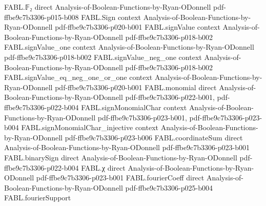 \begin{theorem}
\label{FABL.isDualFourierGranular_signValue_of_dualSpectralSparsity_le}
\leanok
{}
\proofstep
  {FABL.𝔽₂}
  {direct}
  {Analysis-of-Boolean-Functions-by-Ryan-ODonnell}
  {pdf-ffbe9c7b3306-p015-b008}
\proofstep
  {FABL.Sign}
  {context}
  {Analysis-of-Boolean-Functions-by-Ryan-ODonnell}
  {pdf-ffbe9c7b3306-p020-b001}
\proofstep
  {FABL.signValue}
  {context}
  {Analysis-of-Boolean-Functions-by-Ryan-ODonnell}
  {pdf-ffbe9c7b3306-p018-b002}
\proofstep
  {FABL.signValue_one}
  {context}
  {Analysis-of-Boolean-Functions-by-Ryan-ODonnell}
  {pdf-ffbe9c7b3306-p018-b002}
\proofstep
  {FABL.signValue_neg_one}
  {context}
  {Analysis-of-Boolean-Functions-by-Ryan-ODonnell}
  {pdf-ffbe9c7b3306-p018-b002}
\proofstep
  {FABL.signValue_eq_neg_one_or_one}
  {context}
  {Analysis-of-Boolean-Functions-by-Ryan-ODonnell}
  {pdf-ffbe9c7b3306-p020-b001}
\proofstep
  {FABL.monomial}
  {direct}
  {Analysis-of-Boolean-Functions-by-Ryan-ODonnell}
  {pdf-ffbe9c7b3306-p022-b001,
    pdf-ffbe9c7b3306-p022-b004}
\proofstep
  {FABL.signMonomialChar}
  {context}
  {Analysis-of-Boolean-Functions-by-Ryan-ODonnell}
  {pdf-ffbe9c7b3306-p023-b001,
    pdf-ffbe9c7b3306-p023-b004}
\proofstep
  {FABL.signMonomialChar_injective}
  {context}
  {Analysis-of-Boolean-Functions-by-Ryan-ODonnell}
  {pdf-ffbe9c7b3306-p023-b006}
\proofstep
  {FABL.coordinateSum}
  {direct}
  {Analysis-of-Boolean-Functions-by-Ryan-ODonnell}
  {pdf-ffbe9c7b3306-p023-b001}
\proofstep
  {FABL.binarySign}
  {direct}
  {Analysis-of-Boolean-Functions-by-Ryan-ODonnell}
  {pdf-ffbe9c7b3306-p022-b004}
\proofstep
  {FABL.χ}
  {direct}
  {Analysis-of-Boolean-Functions-by-Ryan-ODonnell}
  {pdf-ffbe9c7b3306-p023-b001}
\proofstep
  {FABL.fourierCoeff}
  {direct}
  {Analysis-of-Boolean-Functions-by-Ryan-ODonnell}
  {pdf-ffbe9c7b3306-p025-b004}
\proofstep
  {FABL.fourierSupport}

\end{theorem}
